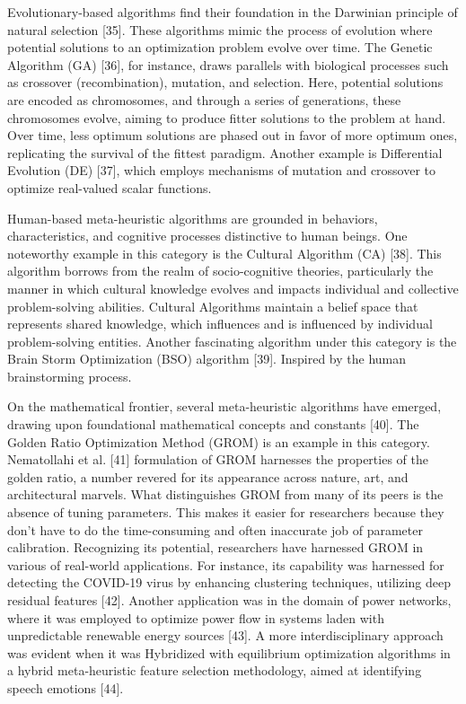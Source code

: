 Evolutionary-based algorithms find their foundation in the Darwinian principle of natural selection [35]. These algorithms mimic the process of evolution where potential solutions to an optimization problem evolve over time. The Genetic Algorithm (GA) [36], for instance, draws parallels with biological processes such as crossover (recombination), mutation, and selection. Here, potential solutions are encoded as chromosomes, and through a series of generations, these chromosomes evolve, aiming to produce fitter solutions to the problem at hand. Over time, less optimum solutions are phased out in favor of more optimum ones, replicating the survival of the fittest paradigm. Another example is Differential Evolution (DE) [37], which employs mechanisms of mutation and crossover to optimize real-valued scalar functions.

Human-based meta-heuristic algorithms are grounded in behaviors, characteristics, and cognitive processes distinctive to human beings. One noteworthy example in this category is the Cultural Algorithm (CA) [38]. This algorithm borrows from the realm of socio-cognitive theories, particularly the manner in which cultural knowledge evolves and impacts individual and collective problem-solving abilities. Cultural Algorithms maintain a belief space that represents shared knowledge, which influences and is influenced by individual problem-solving entities. Another fascinating algorithm under this category is the Brain Storm Optimization (BSO) algorithm [39]. Inspired by the human brainstorming process.

On the mathematical frontier, several meta-heuristic algorithms have emerged, drawing upon foundational mathematical concepts and constants [40]. The Golden Ratio Optimization Method (GROM) is an example in this category. Nematollahi et al. [41] formulation of GROM harnesses the properties of the golden ratio, a number revered for its appearance across nature, art, and architectural marvels. What distinguishes GROM from many of its peers is the absence of tuning parameters. This makes it easier for researchers because they don’t have to do the time-consuming and often inaccurate job of parameter calibration. Recognizing its potential, researchers have harnessed GROM in various of real-world applications. For instance, its capability was harnessed for detecting the COVID-19 virus by enhancing clustering techniques, utilizing deep residual features [42]. Another application was in the domain of power networks, where it was employed to optimize power flow in systems laden with unpredictable renewable energy sources [43]. A more interdisciplinary approach was evident when it was Hybridized with equilibrium optimization algorithms in a hybrid meta-heuristic feature selection methodology, aimed at identifying speech emotions [44].

